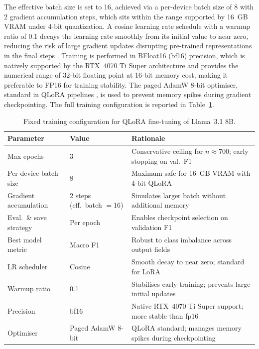The effective batch size is set to 16, achieved via a per-device batch size of 8
with 2 gradient accumulation steps, which sits within the range supported by
16~GB VRAM under 4-bit quantization. A cosine learning rate schedule with a
warmup ratio of 0.1 decays the learning rate smoothly from its initial value to
near zero, reducing the risk of large gradient updates disrupting pre-trained
representations in the final steps \citep{raschka2023lora}. Training is
performed in BFloat16 (bf16) precision, which is natively supported by the
RTX~4070 Ti Super architecture and provides the numerical range of 32-bit
floating point at 16-bit memory cost, making it preferable to FP16 for training
stability. The paged AdamW 8-bit optimiser, standard in QLoRA pipelines
\citep{dettmers2023qlora}, is used to prevent memory spikes during gradient
checkpointing. The full training configuration is reported in
Table~\ref{tab:training_config}.

\begin{table}[ht]
\centering
\caption{Fixed training configuration for QLoRA fine-tuning of Llama~3.1 8B.}
\label{tab:training_config}
\begin{tabular}{p{4.5cm} p{3.5cm} p{6.5cm}}
\toprule
\textbf{Parameter} & \textbf{Value} & \textbf{Rationale} \\
\midrule
Max epochs              & 3
  & Conservative ceiling for $n \approx 700$; early stopping on val.\ F1 \\
Per-device batch size   & 8
  & Maximum safe for 16~GB VRAM with 4-bit QLoRA \\
Gradient accumulation   & 2 steps (eff.\ batch $= 16$)
  & Simulates larger batch without additional memory \\
Eval.\ \& save strategy & Per epoch
  & Enables checkpoint selection on validation F1 \\
Best model metric       & Macro F1
  & Robust to class imbalance across output fields \\
LR scheduler            & Cosine
  & Smooth decay to near zero; standard for LoRA \\
Warmup ratio            & 0.1
  & Stabilises early training; prevents large initial updates \\
Precision               & bf16
  & Native RTX~4070 Ti Super support; more stable than fp16 \\
Optimiser               & Paged AdamW 8-bit
  & QLoRA standard; manages memory spikes during checkpointing \\
\bottomrule
\end{tabular}
\end{table}
